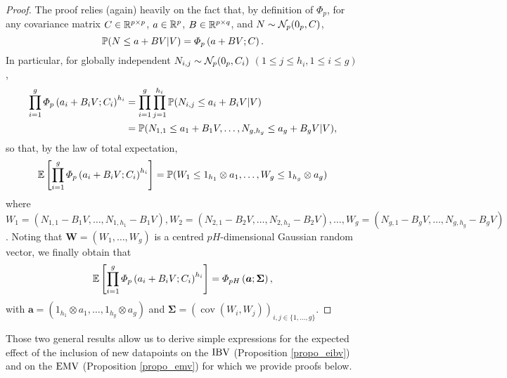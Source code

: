 \begin{proof}
    The proof relies (again) heavily on the fact that, by definition of $\Phi_{p}$, for any covariance matrix $C \in \mathbb{R}^{p \times p}$, $a\in \mathbb{R}^p$, $B\in \mathbb{R}^{p \times q}$, and $N\sim \mathcal{N}_{p}(0_{p},C)$,
    $$
    \mathbb{P}(N\leq a + BV | V)
    =
    \varPhi_{p}\left( a + BV; C \right).
    $$
In particular, for globally independent $N_{i,j} \sim \mathcal{N}_{p}(0_{p},C_i)$ $(1\leq j \leq h_i, 1\leq i \leq g)$,
\begin{equation*}
\begin{split}
\prod_{i=1}^{g} \varPhi_{p}\left(a_i + B_{i}V; \covN_{i} \right)^{h_i}
&=
\prod_{i=1}^{g}
\prod_{j=1}^{h_{i}}
\mathbb{P}(N_{i,j}\leq a_i + B_i V | V)\\
&=\mathbb{P}(N_{1,1}\leq a_1 + B_1 V, \dots, N_{g,h_{g}}\leq a_g + B_g V | V),
\end{split} 
\end{equation*}
so that, by the law of total expectation,
    \begin{equation*}
    \begin{split}
    \mathbb{E}\left[ \prod_{i=1}^{g} \varPhi_{p}\left(a_i + B_{i}V; \covN_{i} \right)^{h_i} \right]
=
\mathbb{P}(W_{1} \leq 1_{h_{1}} \otimes a_1, \dots, W_{g} \leq 1_{h_{g}} \otimes a_g)
    \end{split}
    \end{equation*}
where
$W_{1}=(N_{1,1}- B_1 V, \dots, N_{1,h_{1}}- B_1 V), 
W_{2}=(N_{2,1}- B_2 V, \dots, N_{2,h_{2}}- B_2 V), 
\dots, W_{g}=(N_{g,1}- B_g V, \dots, N_{g,h_{g}}- B_g V)$. Noting that $\mathbf{W}=(W_1,\dots, W_g)$ is a centred $p H$-dimensional Gaussian random vector, we finally obtain that
    \begin{equation*}
\begin{split}
\mathbb{E}\left[ \prod_{i=1}^{g} \varPhi_{p}\left(a_i + B_{i}V; \covN_{i} \right)^{h_i} \right]
=
\varPhi_{p H}\left(\bm{a};\mathbf{\Sigma}\right),
    \end{split}
\end{equation*}
with $\bm{a}=(1_{h_{1}} \otimes a_1, \dots, 1_{h_{g}} \otimes a_g)$ and $\bm{\Sigma}=(\operatorname{cov}(W_i,W_j))_{i,j \in \{1,\dots, g\}}$.
\end{proof}

Those two general results allow us to derive simple expressions for the expected effect of the inclusion of new datapoints on the $\operatorname{IBV}$ (Proposition \ref{propo_eibv}) and on the $\operatorname{EMV}$ (Proposition \ref{propo_emv}) for which we provide proofs below.



